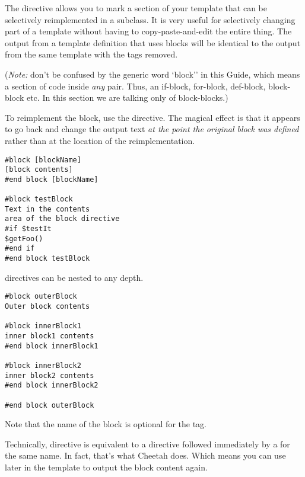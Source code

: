 The  directive allows you to mark a section of your template that
can be selectively reimplemented in a subclass.  It is very useful for
selectively changing part of a template without having to copy-paste-and-edit
the entire thing.  The output from a template definition that uses blocks will
be identical to the output from the same template with the  tags removed. 

({\em Note:} don't be confused by the generic word `block'' in this Guide,
which means a section of code inside {\em any} 
pair.  Thus, an if-block, for-block, def-block, block-block etc.  In this
section we are talking only of block-blocks.)

To reimplement the block, use the  directive.  The magical effect
is that it appears to go back and change the output text {\em at the point the
original block was defined} rather than at the location of the
reimplementation.

\begin{verbatim}
#block [blockName] 
[block contents] 
#end block [blockName]

#block testBlock
Text in the contents 
area of the block directive
#if $testIt
$getFoo() 
#end if
#end block testBlock
\end{verbatim}


 directives can be nested to any depth.

\begin{verbatim}
#block outerBlock
Outer block contents 

#block innerBlock1
inner block1 contents 
#end block innerBlock1

#block innerBlock2
inner block2 contents 
#end block innerBlock2

#end block outerBlock
\end{verbatim}

Note that the name of the block is optional for the  tag.

Technically,  directive is equivalent to a  directive
followed immediately by a  for the same name.  In fact,
that's what Cheetah does.  Which means you can use 
later in the template to output the block content again.



